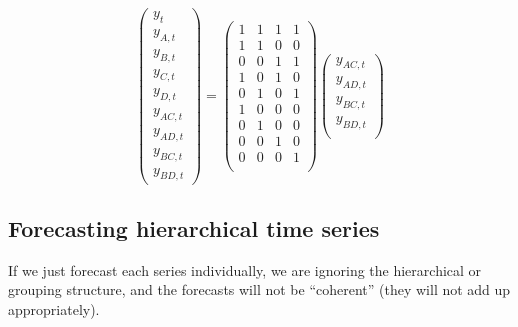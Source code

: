 \documentclass[11pt,a4paper,]{article}
\begin{document}
\begin{equation}\label{eq:Smatrixexample}
\begin{pmatrix}
  y_{t}\\y_{A,t}\\y_{B,t}\\y_{C,t}\\y_{D,t}\\y_{AC,t}\\y_{AD,t}\\y_{BC,t}\\y_{BD,t}
\end{pmatrix} =
\begin{pmatrix}
  1&1&1&1\\1&1&0&0\\0&0&1&1\\1&0&1&0\\0&1&0&1\\1&0&0&0\\0&1&0&0\\0&0&1&0\\0&0&0&1\\
\end{pmatrix}
\begin{pmatrix}
  y_{AC,t}\\y_{AD,t}\\y_{BC,t}\\y_{BD,t}\\
\end{pmatrix}
\end{equation}

\subsection{Forecasting hierarchical time
series}\label{forecasting-hierarchical-time-series}

If we just forecast each series individually, we are ignoring the
hierarchical or grouping structure, and the forecasts will not be
``coherent'' (they will not add up appropriately).
\end{document}
